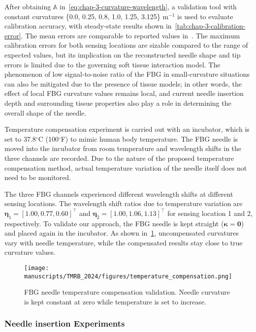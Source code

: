 After obtaining $\mathbb{A}$ in~\cref{eq:chap-3-curvature-wavelength}, a validation tool with constant curvatures \{0.0, 0.25, 0.8, 1.0, 1.25, 3.125\} m$^{-1}$ is used to evaluate calibration accuracy, with steady-state results shown in~\cref{tab:chap-3-calibration-error}. The mean errors are comparable to reported values in~\parencite{kimShapeDeterminationNeedle2017}. The maximum calibration errors for both sensing locations are sizable compared to the range of expected values, but its implication on the reconstructed needle shape and tip errors is limited due to the governing soft tissue interaction model. The phenomenon of low signal-to-noise ratio of the FBG in small-curvature situations can also be mitigated due to the presence of tissue models; in other words, the effect of local FBG curvature values remains local, and current needle insertion depth and surrounding tissue properties also play a role in determining the overall shape of the needle.

Temperature compensation experiment is carried out with an incubator, which is set to 37.8$^{\circ}$C (100$^{\circ}$F) to mimic human body temperature. The FBG needle is moved into the incubator from room temperature and wavelength shifts in the three channels are recorded. Due to the nature of the proposed temperature compensation method, actual temperature variation of the needle itself does not need to be monitored.

The three FBG channels experienced different wavelength shifts at different sensing locations. The wavelength shift ratios due to temperature variation are $\boldsymbol\eta_1 = [1.00, 0.77, 0.60]^{\top}$ and $\boldsymbol\eta_2 = [1.00, 1.06, 1.13]^{\top}$ for sensing location 1 and 2, respectively. To validate our approach, the FBG needle is kept straight ($\boldsymbol\kappa = \mathbf{0}$) and placed again in the incubator. As shown in~\cref{fig:chap-3-temperature-compensation}, uncompensated curvatures vary with needle temperature, while the compensated results stay close to true curvature values.

\begin{figure}[!h]
  \centering
  \texttt{[image: manuscripts/TMRB\_2024/figures/temperature\_compensation.png]}
  \caption{FBG needle temperature compensation validation. Needle curvature is kept constant at zero while temperature is set to increase.}
  \label{fig:chap-3-temperature-compensation}
\end{figure}

\subsubsection{Needle insertion Experiments}
\label{sec:chap-3-needle-insertion-experiments}

